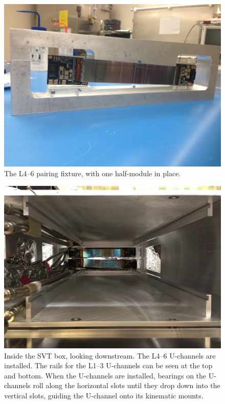\begin{figure}[ht]
    \includegraphics[width=\textwidth]{detector/figs/pairing_l456}
    \caption{The L4--6 pairing fixture, with one half-module in place.}
    \label{fig:l456_pairing}
\end{figure}

\begin{figure}[ht]
    \includegraphics[angle=90,width=\textwidth]{detector/figs/drawers}
    \caption{Inside the SVT box, looking downstream.
    The L4--6 U-channels are installed.
The rails for the L1--3 U-channels can be seen at the top and bottom. When the U-channels are installed, bearings on the U-channels roll along the horizontal slots until they drop down into the vertical slots, guiding the U-channel onto its kinematic mounts.}
    \label{fig:drawers}
\end{figure}

